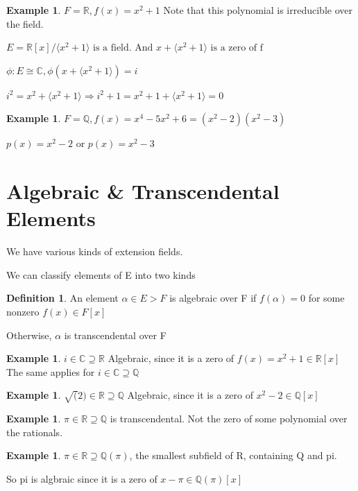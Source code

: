 \documentclass[11pt]{article}
\theoremstyle{definition}
\newtheorem{definition}[theorem]{Definition}
\newtheorem{example}[theorem]{Example}
\theoremstyle{remark}
\begin{document}
\begin{example}
    $F = \mathbb{R}, f(x) = x^2 + 1$ Note that this polynomial is irreducible over the field. 
    
    $E = \mathbb{R}[x] / \langle x^2 + 1 \rangle \text{ is a field. And } x + \langle x^2 + 1 \rangle \text{ is a zero of f}$

    $\phi: E \cong \mathbb{C}, \phi(x + \langle x^2 + 1 \rangle) = i$

    $i^2 = x^2 + \langle x^2 + 1 \rangle \Rightarrow i^2 + 1 = x^2 + 1 + \langle x^2 + 1 \rangle = 0$

\end{example}

\begin{example}
    $F = \mathbb{Q}, f(x) = x^4 - 5x^2 + 6 = (x^2-2)(x^2-3)$
    
    $p(x) = x^2 -2$ or $p(x) = x^2 - 3$

    
\end{example}

\section{Algebraic \& Transcendental Elements}
We have various kinds of extension fields. 

We can classify elements of E into two kinds 

\begin{definition}
    An element $\alpha \in E > F$ is algebraic over F if $f(\alpha) = 0$ for some nonzero $f(x) \in F[x]$

    Otherwise, $\alpha$ is transcendental over F

\end{definition}

\begin{example}
    $i \in \mathbb{C} \supseteq \mathbb{R}$
    Algebraic, since it is a zero of $f(x) = x^2 + 1 \in \mathbb{R}[x]$
    The same applies for $i \in \mathbb{C} \supseteq \mathbb{Q}$
\end{example}
\begin{example}
    $\sqrt(2) \in \mathbb{R} \supseteq \mathbb{Q}$
    Algebraic, since it is a zero of $x^2-2 \in \mathbb{Q}[x]$
\end{example}
\begin{example}
    $\pi \in \mathbb{R} \supseteq \mathbb{Q}$ is transcendental. Not the zero of some polynomial over the rationals.  
\end{example}
\begin{example}
    $\pi \in \mathbb{R} \supseteq \mathbb{Q}(\pi)$, the smallest subfield of R, containing Q and pi. 

    So pi is algbraic since it is a zero of $x - \pi \in\mathbb{Q}(\pi)[x]$
    
\end{example}
\end{document}
